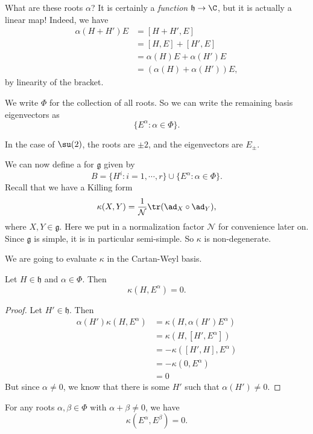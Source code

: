 \documentclass[a4paper]{article}
\begin{document}
What are these roots $\alpha$? It is certainly a \emph{function} $\mathfrak{h} \to \C$, but it is actually a linear map! Indeed, we have
\begin{align*}
  \alpha(H + H')E &= [H + H', E] \\
  &= [H, E] + [H', E] \\
  &= \alpha(H) E + \alpha(H') E \\
  &= (\alpha(H) + \alpha(H'))E,
\end{align*}
by linearity of the bracket.

We write $\Phi$\index{$\Phi$} for the collection of all roots. So we can write the remaining basis eigenvectors as
\[
  \{E^\alpha: \alpha \in \Phi\}.
\]
\begin{eg}
  In the case of $\su(2)$, the roots are $\pm 2$, and the eigenvectors are $E_{\pm}$.
\end{eg}

We can now define a  for $\mathfrak{g}$ given by
\[
  B = \{H^i: i = 1, \cdots, r\} \cup \{E^\alpha: \alpha \in \Phi\}.
\]
Recall that we have a Killing form
\[
 \kappa(X, Y) = \frac{1}{\mathcal{N}} \tr(\ad_X \circ \ad_Y),
\]
where $X, Y \in \mathfrak{g}$. Here we put in a normalization factor $\mathcal{N}$ for convenience later on. Since $\mathfrak{g}$ is simple, it is in particular semi-simple. So $\kappa$ is non-degenerate.

We are going to evaluate $\kappa$ in the Cartan-Weyl basis.

\begin{lemma}
  Let $H \in \mathfrak{h}$ and $\alpha \in \Phi$. Then
  \[
    \kappa(H, E^\alpha) = 0.
  \]
\end{lemma}
\begin{proof}
  Let $H' \in \mathfrak{h}$. Then
  \begin{align*}
    \alpha(H')\kappa(H, E^\alpha) &= \kappa(H, \alpha(H') E^\alpha) \\
    &= \kappa(H, [H', E^\alpha])\\
    &= -\kappa([H', H], E^\alpha)\\
    &= -\kappa(0, E^\alpha)\\
    &= 0
  \end{align*}
  But since $\alpha \not= 0$, we know that there is some $H'$ such that $\alpha(H') \not= 0$.
\end{proof}

\begin{lemma}
  For any roots $\alpha, \beta \in \Phi$ with $\alpha + \beta \not= 0$, we have
  \[
    \kappa(E^\alpha, E^\beta) = 0.
  \]
\end{lemma}
\end{document}
